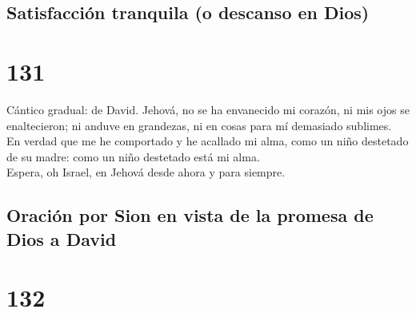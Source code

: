 \hypertarget{satisfacciuxf3n-tranquila-o-descanso-en-dios}{%
\subsection{Satisfacción tranquila (o descanso en
Dios)}\label{satisfacciuxf3n-tranquila-o-descanso-en-dios}}

\hypertarget{section-19-131}{%
\section{131}\label{section-19-131}}

 Cántico gradual: de David. Jehová, no se ha envanecido mi
corazón, ni mis ojos se enaltecieron; ni anduve en grandezas, ni en
cosas para mí demasiado sublimes.\\
 En verdad que me he comportado y he acallado mi alma,
como un niño destetado de su madre: como un niño destetado está mi
alma.\\
 Espera, oh Israel, en Jehová desde ahora y para siempre.

\hypertarget{oraciuxf3n-por-sion-en-vista-de-la-promesa-de-dios-a-david}{%
\subsection{Oración por Sion en vista de la promesa de Dios a
David}\label{oraciuxf3n-por-sion-en-vista-de-la-promesa-de-dios-a-david}}

\hypertarget{section-19-132}{%
\section{132}\label{section-19-132}}

